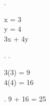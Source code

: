\left. \begin {cases} {x = 3} \\ {y = 4} \\ {3x + 4y} \end {cases} \right.
\left. \begin {cases} {3(3) = 9} \\ {4(4) = 16} \end {cases} \right.
9 + 16 = 25
